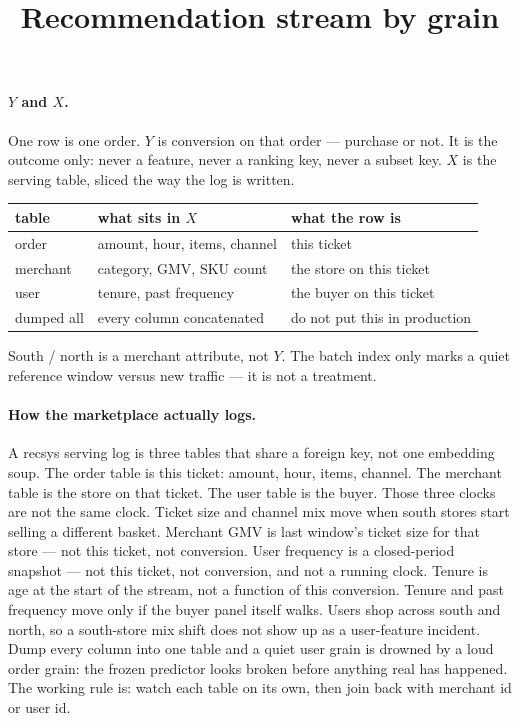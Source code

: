 \documentclass[11pt]{article}
\title{Recommendation stream by grain}
\author{}
\date{}
\begin{document}
\maketitle
\thispagestyle{empty}

\paragraph{$Y$ and $X$.}
One row is one order. $Y$ is conversion on that order --- purchase or not.
It is the outcome only: never a feature, never a ranking key, never a subset key.
$X$ is the serving table, sliced the way the log is written.

\begin{center}
\begin{tabular}{lll}
\toprule
table & what sits in $X$ & what the row is \\
\midrule
order & amount, hour, items, channel & this ticket \\
merchant & category, GMV, SKU count & the store on this ticket \\
user & tenure, past frequency & the buyer on this ticket \\
dumped all & every column concatenated & do not put this in production \\
\bottomrule
\end{tabular}
\end{center}

South / north is a merchant attribute, not $Y$.
The batch index only marks a quiet reference window versus new traffic --- it is not a treatment.

\paragraph{How the marketplace actually logs.}
A recsys serving log is three tables that share a foreign key, not one embedding soup.
The order table is this ticket: amount, hour, items, channel.
The merchant table is the store on that ticket.
The user table is the buyer.
Those three clocks are not the same clock.
Ticket size and channel mix move when south stores start selling a different basket.
Merchant GMV is last window's ticket size for that store --- not this ticket, not conversion.
User frequency is a closed-period snapshot --- not this ticket, not conversion, and not a running clock.
Tenure is age at the start of the stream, not a function of this conversion.
Tenure and past frequency move only if the buyer panel itself walks.
Users shop across south and north, so a south-store mix shift does not show up as a user-feature incident.
Dump every column into one table and a quiet user grain is drowned by a loud order grain: the frozen predictor looks broken before anything real has happened.
The working rule is: watch each table on its own, then join back with merchant id or user id.
\end{document}
